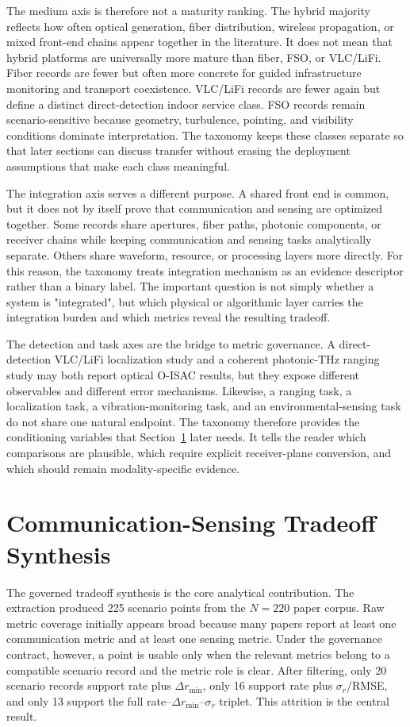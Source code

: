 \documentclass[letterpaper,journal]{IEEEtran}
\begin{document}
The medium axis is therefore not a maturity ranking. The hybrid majority reflects how often optical generation, fiber distribution, wireless propagation, or mixed front-end chains appear together in the literature. It does not mean that hybrid platforms are universally more mature than fiber, FSO, or VLC/LiFi. Fiber records are fewer but often more concrete for guided infrastructure monitoring and transport coexistence. VLC/LiFi records are fewer again but define a distinct direct-detection indoor service class. FSO records remain scenario-sensitive because geometry, turbulence, pointing, and visibility conditions dominate interpretation. The taxonomy keeps these classes separate so that later sections can discuss transfer without erasing the deployment assumptions that make each class meaningful.

The integration axis serves a different purpose. A shared front end is common, but it does not by itself prove that communication and sensing are optimized together. Some records share apertures, fiber paths, photonic components, or receiver chains while keeping communication and sensing tasks analytically separate. Others share waveform, resource, or processing layers more directly. For this reason, the taxonomy treats integration mechanism as an evidence descriptor rather than a binary label. The important question is not simply whether a system is "integrated", but which physical or algorithmic layer carries the integration burden and which metrics reveal the resulting tradeoff.

The detection and task axes are the bridge to metric governance. A direct-detection VLC/LiFi localization study and a coherent photonic-THz ranging study may both report optical O-ISAC results, but they expose different observables and different error mechanisms. Likewise, a ranging task, a localization task, a vibration-monitoring task, and an environmental-sensing task do not share one natural endpoint. The taxonomy therefore provides the conditioning variables that Section~\ref{sec:tradeoff} later needs. It tells the reader which comparisons are plausible, which require explicit receiver-plane conversion, and which should remain modality-specific evidence.

\section{Communication-Sensing Tradeoff Synthesis}
\label{sec:tradeoff}

The governed tradeoff synthesis is the core analytical contribution. The extraction produced 225 scenario points from the \(N=220\) paper corpus. Raw metric coverage initially appears broad because many papers report at least one communication metric and at least one sensing metric. Under the governance contract, however, a point is usable only when the relevant metrics belong to a compatible scenario record and the metric role is clear. After filtering, only 20 scenario records support rate plus \(\Delta r_{\min}\), only 16 support rate plus \(\sigma_r\)/RMSE, and only 13 support the full rate--\(\Delta r_{\min}\)--\(\sigma_r\) triplet. This attrition is the central result.
\end{document}
